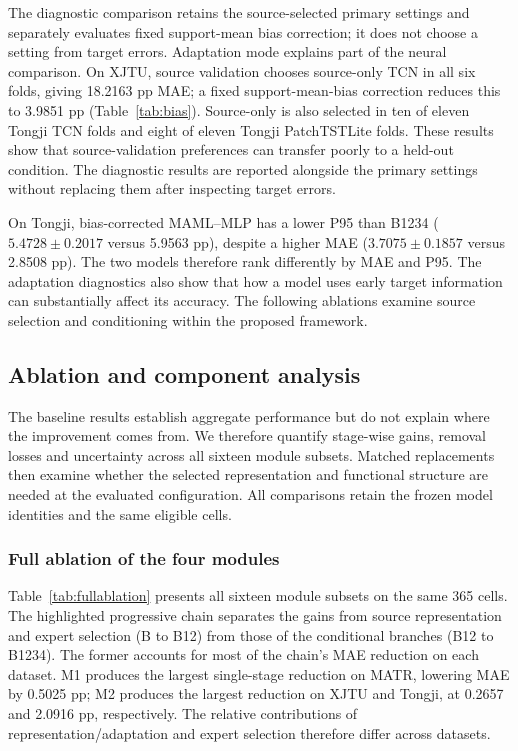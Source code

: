 \documentclass[preprint,12pt]{elsarticle}
\begin{document}
The diagnostic comparison retains the source-selected primary settings and separately evaluates fixed support-mean bias correction; it does not choose a setting from target errors. Adaptation mode explains part of the neural comparison. On XJTU, source validation chooses source-only TCN in all six folds, giving 18.2163 pp MAE; a fixed support-mean-bias correction reduces this to 3.9851 pp (Table~\ref{tab:bias}). Source-only is also selected in ten of eleven Tongji TCN folds and eight of eleven Tongji PatchTSTLite folds. These results show that source-validation preferences can transfer poorly to a held-out condition. The diagnostic results are reported alongside the primary settings without replacing them after inspecting target errors.



On Tongji, bias-corrected MAML--MLP has a lower P95 than B1234 ($5.4728\pm0.2017$ versus 5.9563 pp), despite a higher MAE ($3.7075\pm0.1857$ versus 2.8508 pp). The two models therefore rank differently by MAE and P95. The adaptation diagnostics also show that how a model uses early target information can substantially affect its accuracy. The following ablations examine source selection and conditioning within the proposed framework.

\subsection{Ablation and component analysis}
\label{sec:ablation}
The baseline results establish aggregate performance but do not explain where the improvement comes from. We therefore quantify stage-wise gains, removal losses and uncertainty across all sixteen module subsets. Matched replacements then examine whether the selected representation and functional structure are needed at the evaluated configuration. All comparisons retain the frozen model identities and the same eligible cells.
\subsubsection{Full ablation of the four modules}
Table~\ref{tab:fullablation} presents all sixteen module subsets on the same 365 cells. The highlighted progressive chain separates the gains from source representation and expert selection (B to B12) from those of the conditional branches (B12 to B1234). The former accounts for most of the chain's MAE reduction on each dataset. M1 produces the largest single-stage reduction on MATR, lowering MAE by 0.5025 pp; M2 produces the largest reduction on XJTU and Tongji, at 0.2657 and 2.0916 pp, respectively. The relative contributions of representation/adaptation and expert selection therefore differ across datasets.
\end{document}
